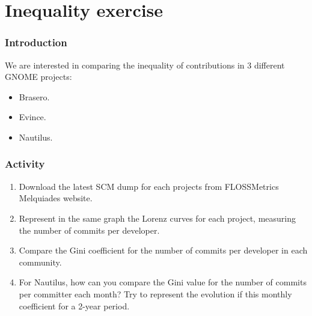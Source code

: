 
\section{Inequality exercise}


\begin{frame}
\frametitle{Introduction}

We are interested in comparing the inequality of contributions in 3 different GNOME projects:

\begin{itemize}
 \item Brasero.
 \item Evince.
 \item Nautilus.
\end{itemize}

\end{frame}


\begin{frame}
\frametitle{Activity}

\begin{enumerate}
 \item Download the latest SCM dump for each projects from FLOSSMetrics Melquiades website.
 \item Represent in the same graph the Lorenz curves for each project, measuring the number
of commits per developer.
 \item Compare the Gini coefficient for the number of commits per developer in each community.
 \item For Nautilus, how can you compare the Gini value for the number of commits per committer
each month? Try to represent the evolution if this monthly coefficient for a 2-year period.
\end{enumerate}


\end{frame}


